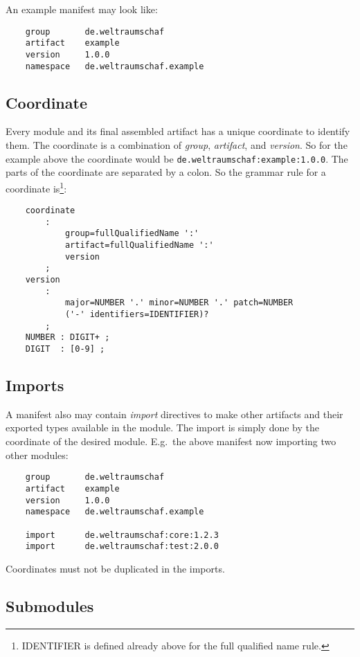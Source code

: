 \documentclass[a4paper,12pt]{report}
\begin{document}
\noindent
An example manifest may look like:

\begin{verbatim}
    group       de.weltraumschaf
    artifact    example
    version     1.0.0
    namespace   de.weltraumschaf.example
\end{verbatim}

\subsection{Coordinate}

Every module and its final assembled artifact has a unique coordinate to identify them. The coordinate is a combination of \textit{group}, \textit{artifact}, and \textit{version}. So for the example above the coordinate would be \texttt{de.weltraumschaf:example:1.0.0}. The parts of the coordinate are separated by a colon. So the grammar rule for a coordinate is\footnote{IDENTIFIER is defined already above for the full qualified name rule.}:

\begin{verbatim}
    coordinate 
        : 
            group=fullQualifiedName ':' 
            artifact=fullQualifiedName ':' 
            version
        ;
    version
        : 
            major=NUMBER '.' minor=NUMBER '.' patch=NUMBER 
            ('-' identifiers=IDENTIFIER)?
        ;        
    NUMBER : DIGIT+ ;
    DIGIT  : [0-9] ;
\end{verbatim}

\subsection{Imports}

A manifest also may contain \textit{import} directives to make other artifacts and their exported types available in the module. The import is simply done by the coordinate of the desired module. E.g.\ the above manifest now importing two other modules:

\begin{verbatim}
    group       de.weltraumschaf
    artifact    example
    version     1.0.0
    namespace   de.weltraumschaf.example
    
    import      de.weltraumschaf:core:1.2.3
    import      de.weltraumschaf:test:2.0.0
\end{verbatim}

Coordinates must not be duplicated in the imports.

\subsection{Submodules}
\end{document}
